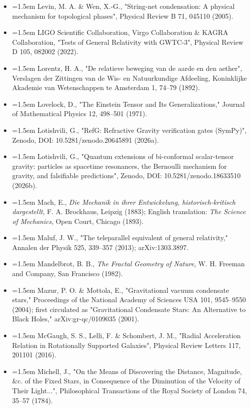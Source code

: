 \documentclass[11pt,a4paper]{article}
\begin{document}
\begin{itemize}[leftmargin=1.5em,label={}]
\item \hangindent=1.5em Levin, M. A. \& Wen, X.-G., "String-net condensation: A physical mechanism for topological phases", Physical Review B 71, 045110 (2005).
\item \hangindent=1.5em LIGO Scientific Collaboration, Virgo Collaboration \& KAGRA Collaboration, "Tests of General Relativity with GWTC-3", Physical Review D 105, 082002 (2022).
\item \hangindent=1.5em Lorentz, H. A., "De relatieve beweging van de aarde en den aether", Verslagen der Zittingen van de Wis- en Natuurkundige Afdeeling, Koninklijke Akademie van Wetenschappen te Amsterdam 1, 74–79 (1892).
\item \hangindent=1.5em Lovelock, D., "The Einstein Tensor and Its Generalizations," Journal of Mathematical Physics 12, 498–501 (1971).
\item \hangindent=1.5em Lotishvili, G., "RefG: Refractive Gravity verification gates (SymPy)", Zenodo, DOI: 10.5281/zenodo.20645891 (2026a).
\item \hangindent=1.5em Lotishvili, G., "Quantum extensions of bi-conformal scalar-tensor gravity: particles as spacetime resonances, the Bernoulli mechanism for gravity, and falsifiable predictions", Zenodo, DOI: 10.5281/zenodo.18633510 (2026b).
\item \hangindent=1.5em Mach, E., \emph{Die Mechanik in ihrer Entwickelung, historisch-kritisch dargestellt}, F. A. Brockhaus, Leipzig (1883); English translation: \emph{The Science of Mechanics}, Open Court, Chicago (1893).
\item \hangindent=1.5em Maluf, J. W., "The teleparallel equivalent of general relativity," Annalen der Physik 525, 339–357 (2013); arXiv:1303.3897.
\item \hangindent=1.5em Mandelbrot, B. B., \emph{The Fractal Geometry of Nature}, W. H. Freeman and Company, San Francisco (1982).
\item \hangindent=1.5em Mazur, P. O. \& Mottola, E., "Gravitational vacuum condensate stars," Proceedings of the National Academy of Sciences USA 101, 9545–9550 (2004); first circulated as "Gravitational Condensate Stars: An Alternative to Black Holes," arXiv:gr-qc/0109035 (2001).
\item \hangindent=1.5em McGaugh, S. S., Lelli, F. \& Schombert, J. M., "Radial Acceleration Relation in Rotationally Supported Galaxies", Physical Review Letters 117, 201101 (2016).
\item \hangindent=1.5em Michell, J., "On the Means of Discovering the Distance, Magnitude, \&c. of the Fixed Stars, in Consequence of the Diminution of the Velocity of Their Light...", Philosophical Transactions of the Royal Society of London 74, 35–57 (1784).

\end{itemize}
\end{document}
